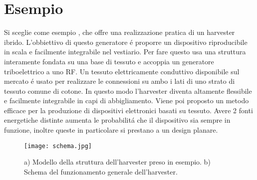 \chapter{Esempio}
    Si sceglie come esempio \cite{kouWearableAllFabricHybrid2024}, che offre una realizzazione pratica di un harvester ibrido. L'obbiettivo di questo generatore \'e proporre un dispositivo riproducibile in scala e facilmente integrabile nel vestiario. Per fare questo usa una struttura interamente fondata su una base di tessuto e accoppia un generatore triboelettrico a uno RF. Un tessuto elettricamente conduttivo disponibile sul mercato \'e usato per realizzare le connessioni su ambo i lati di uno strato di tessuto comune di cotone. In questo modo l'harvester diventa altamente flessibile e facilmente integrabile in capi di abbigliamento. Viene poi proposto un metodo efficace per la produzione di dispositivi elettronici basati su tessuto. Avere 2 fonti energetiche distinte aumenta le probabilit\'a che il dispositivo sia sempre in funzione, inoltre queste in particolare si prestano a un design planare.
    
    \begin{figure}[H]
        \texttt{[image: schema.jpg]}
        \centering
        \caption{a) Modello della struttura dell'harvester preso in esempio. b) Schema del funzionamento generale dell'harvester.\cite{kouWearableAllFabricHybrid2024}}
        \label{fig:schema}
    \end{figure}

